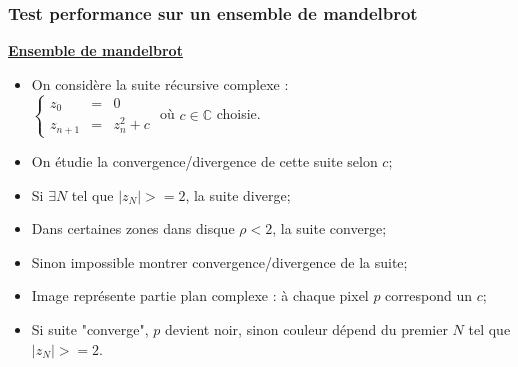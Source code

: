 \documentclass{beamer}
\begin{document}
\begin{frame}[fragile]
\frametitle{Test performance sur un ensemble de mandelbrot}

\underline{\textbf{\textcolor{BrickRed}{Ensemble de mandelbrot}}}

\begin{itemize}
\item On considère la suite récursive complexe : \\
$
\left\{
    \begin{array}{lcl}
        z_{0} & = & 0 \\
        z_{n+1} & = & z_{n}^{2} + c
    \end{array}
\right.
$
où $c\in\mathbb{C}$ choisie.
\item On étudie la convergence/divergence de cette suite selon $c$;
\item Si $\exists N$ tel que $\vert z_{N} \vert >= 2$, la suite diverge;
\item Dans certaines zones dans disque $\rho < 2$, la suite converge;
\item Sinon impossible montrer convergence/divergence de la suite;
\item Image représente partie plan complexe : à chaque pixel $p$ correspond un $c$;
\item Si suite "converge", $p$ devient noir, sinon couleur dépend du premier $N$ tel que 
$\vert z_{N}\vert >=2$.
\end{itemize}

\end{frame}
\end{document}
